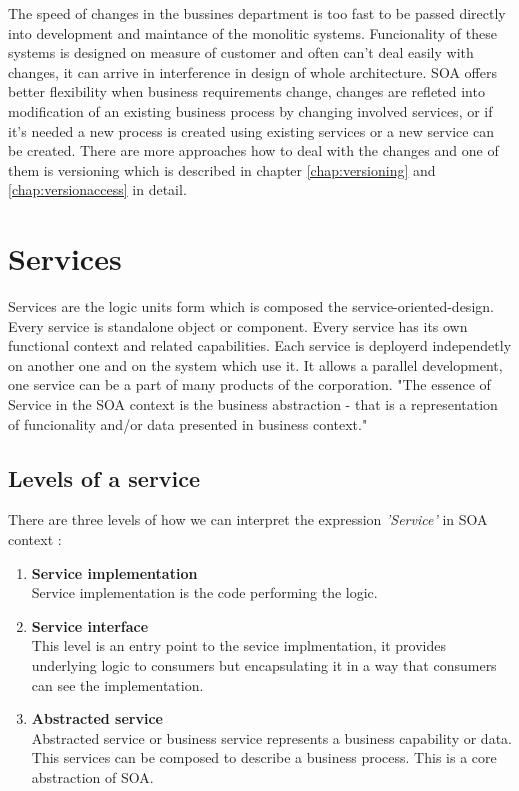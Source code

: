 The speed of changes in the bussines department is too fast to be passed directly into development and maintance of the monolitic systems. Funcionality of these systems is designed on measure of customer and often can't deal easily with changes, it can arrive in interference in design of whole architecture. SOA offers better flexibility when business requirements change, changes are refleted into modification of an existing business process by changing involved services, or if it's needed a new process is created using existing services or a new service can be created. There are more approaches how to deal with the changes and one of them is versioning which is described in chapter \ref{chap:versioning} and \ref{chap:versionaccess} in detail.

\section{Services}
\label{sec:services}
Services are the logic units form which is composed the \gls{service-oriented-design}. Every service is standalone object or component. Every service has its own functional context and related capabilities. Each service is deployerd independetly on another one and on the system which use it. It allows a parallel development, one service can be a part of many products of the corporation.
"The essence of Service in the SOA context is the business abstraction - that is a representation of funcionality and/or data presented in business context." \cite{agile-architecture}

\subsection{Levels of a service} 
\label{subsec:levels-of-serivce}

There are three levels of how we can interpret the expression \emph{'Service'} in SOA context \cite{agile-architecture}:
\begin{enumerate}
  \item \textbf{Service implementation} \hfill \\
Service implementation is the code performing the logic.
  \item \textbf{Service interface} \hfill \\ 
This level is an entry point to the sevice implmentation, it provides underlying logic to consumers but encapsulating it in a way that consumers can see the implementation. 
  \item \textbf{Abstracted service} \hfill \\
Abstracted service or business service represents a business capability or data. This services can be composed to describe a business process. This is a core abstraction of SOA.
\end{enumerate}

